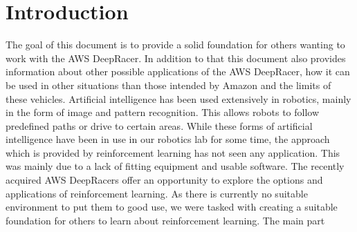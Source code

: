 \chapter{Introduction}
\label{cha:Introduction}


The goal of this document is to provide a solid foundation for others wanting to work with the AWS DeepRacer. In addition to that this document also provides information about other possible applications of the AWS DeepRacer, how it can be used in other situations than those intended by Amazon and the limits of these vehicles. Artificial intelligence has been used extensively in robotics, mainly in the form of image and pattern recognition. This allows robots to follow predefined paths or drive to certain areas. While these forms of artificial intelligence have been in use in our robotics lab for some time, the approach which is provided by reinforcement learning has not seen any application. This was mainly due to a lack of fitting equipment and usable software. The recently acquired AWS DeepRacers offer an opportunity to explore the options and applications of reinforcement learning. As there is currently no suitable environment to put them to good use, we were tasked with creating a suitable foundation for others to learn about reinforcement learning. The main part




